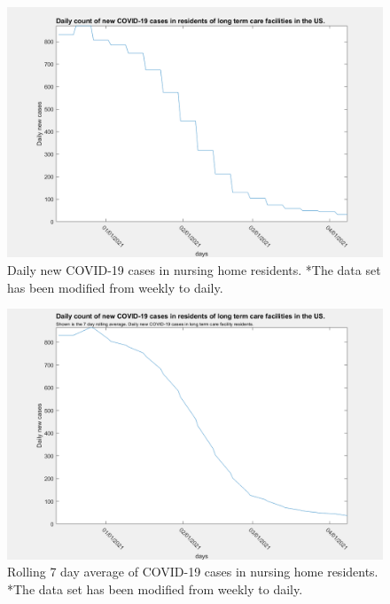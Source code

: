 \documentclass[twoside]{article}
\begin{document}
\begin{multicols}{2}
\begin{figure}[H]
	\includegraphics[width=\linewidth]{images/usa_daily_ltc_cases_unprocessed.png}
	\caption{Daily new COVID-19 cases in nursing home residents. *The data set has been modified from weekly to daily.}
	\label{fig:images/usa_daily_ltc_cases_unprocessedLabel}
\end{figure}

\begin{figure}[H]
	\includegraphics[width=\linewidth]{images/usa_daily_ltc_cases_processed.png}
	\caption{Rolling 7 day average of COVID-19 cases in nursing home residents. *The data set has been modified from weekly to daily.}
	\label{fig:images/usa_daily_ltc_cases_processedLabel}
\end{figure}


\end{multicols}
\end{document}
